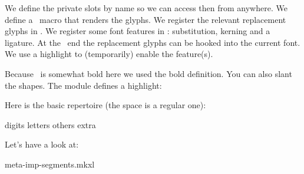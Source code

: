 \stoptitle

\starttitle[title=How is is done]

\startitemize
\startitem We define the private slots by name so we can access then from anywhere. \stopitem
\startitem We define a \METAFUN\ macro that renders the glyphs. \stopitem
\startitem We register the relevant replacement glyphs in \METAFUN. \stopitem
\startitem We register some font features in \LUA: substitution, kerning and a ligature. \stopitem
\startitem At the \TEX\ end the replacement glyphs can be hooked into the current font. \stopitem
\startitem We use a highlight to (temporarily) enable the feature(s). \stopitem
\stopitemize

\stoptitle

\starttitle[title=How is is used]

\starttyping
\useMPlibrary[segments]

\stoptyping

Because \fontclass\ is somewhat bold here we used the bold definition. You can
also slant the shapes. The module defines a highlight:

\starttyping
{}
\stoptyping

\stoptitle

\starttitle[title=How does the code look]

\enabledirectives[visualizers.fraction=1]

Here is the basic repertoire (the space is a regular one):

\starttabulate
\NC digits  \NC \showglyphs {} \NC \NR
\NC letters \NC \showglyphs {}         \NC \NR
\NC others  \NC \showglyphs {}               \NC \NR
\NC extra   \NC \showglyphs {}             \NC \NR
\stoptabulate

Let's have a look at:

\starttyping
meta-imp-segments.mkxl
\stoptyping

\stoptitle

\stopdocument
